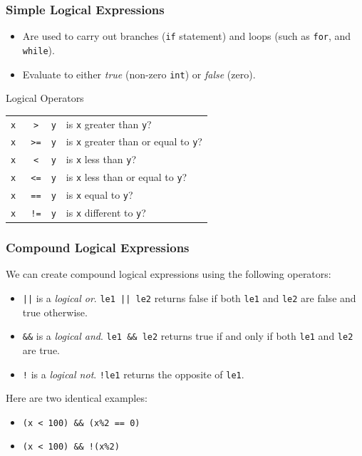 \documentclass[table]{beamer}
\newif\ifschigh\schighfalse
\newcommand{\kw}[1]{\ifschigh\textcolor{red}{#1}\else\textcolor{keyword}{#1}\fi}
\begin{document}
\begin{frame}
\frametitle{Simple Logical Expressions}
\begin{itemize}
\item Are used to carry out branches ({\tt \kw{if}} statement) and loops (such as {\tt \kw{for}}, and {\tt \kw{while}}).
\item Evaluate to either \emph{true} (non-zero \kw{\tt int}) or \emph{false} (zero).
\end{itemize}

\begin{block}{Logical Operators}
\begin{center}
\begin{tabular}{l c l l}
\tt x &\tt>&\tt  y& is {\tt x} greater than {\tt y}?\\
\tt x &\tt>=&\tt y& is {\tt x} greater than or equal to {\tt y}?\\
\tt x &\tt<&\tt  y& is {\tt x} less than {\tt y}?\\
\tt x &\tt<=&\tt y& is {\tt x} less than or equal to {\tt y}?\\
\alert{\tt x }&\tt\alert{==}&\alert{\tt y}&\alert{is {\tt x} equal to {\tt y}?}\\
\tt x &\tt!=&\tt y& is {\tt x} different to {\tt y}?
\end{tabular}
\end{center}
\end{block}
\end{frame}

\begin{frame}
\frametitle{Compound Logical Expressions}
We can create compound logical expressions using the following operators:
\begin{itemize}
 \item {\tt ||} is a \emph{logical or}. {\tt le1 || le2} returns false if both {\tt le1} and {\tt le2} are false and true otherwise.
 \item {\tt \&\&} is a \emph{logical and}. {\tt le1 \&\& le2} returns true if and only if both {\tt le1} and {\tt le2} are true.
 \item {\tt !} is a \emph{logical not}. {\tt !le1} returns the opposite of {\tt le1}.
\end{itemize}
Here are two identical examples:
\begin{itemize}
\item \tt (x < 100) \&\& (x\%2 == 0)\\
\item \tt (x < 100) \&\& !(x\%2)
\end{itemize}
\end{frame}
\end{document}
